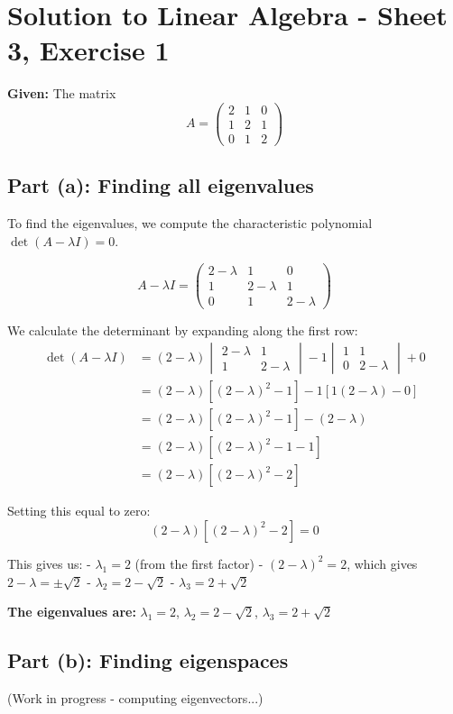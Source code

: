 \documentclass{article}
\begin{document}
\section*{Solution to Linear Algebra - Sheet 3, Exercise 1}

\textbf{Given:} The matrix
$$A = \begin{pmatrix}
2 & 1 & 0 \\
1 & 2 & 1 \\
0 & 1 & 2
\end{pmatrix}$$

\subsection*{Part (a): Finding all eigenvalues}

To find the eigenvalues, we compute the characteristic polynomial $\det(A - \lambda I) = 0$.

$$A - \lambda I = \begin{pmatrix}
2-\lambda & 1 & 0 \\
1 & 2-\lambda & 1 \\
0 & 1 & 2-\lambda
\end{pmatrix}$$

We calculate the determinant by expanding along the first row:
\begin{align}
\det(A - \lambda I) &= (2-\lambda)\begin{vmatrix}
2-\lambda & 1 \\
1 & 2-\lambda
\end{vmatrix} - 1\begin{vmatrix}
1 & 1 \\
0 & 2-\lambda
\end{vmatrix} + 0\\
&= (2-\lambda)[(2-\lambda)^2 - 1] - 1[1(2-\lambda) - 0]\\
&= (2-\lambda)[(2-\lambda)^2 - 1] - (2-\lambda)\\
&= (2-\lambda)[(2-\lambda)^2 - 1 - 1]\\
&= (2-\lambda)[(2-\lambda)^2 - 2]
\end{align}

Setting this equal to zero:
$$(2-\lambda)[(2-\lambda)^2 - 2] = 0$$

This gives us:
- $\lambda_1 = 2$ (from the first factor)
- $(2-\lambda)^2 = 2$, which gives $2-\lambda = \pm\sqrt{2}$
  - $\lambda_2 = 2 - \sqrt{2}$
  - $\lambda_3 = 2 + \sqrt{2}$

\textbf{The eigenvalues are:} $\lambda_1 = 2$, $\lambda_2 = 2 - \sqrt{2}$, $\lambda_3 = 2 + \sqrt{2}$

\subsection*{Part (b): Finding eigenspaces}

(Work in progress - computing eigenvectors...)
\end{document}
